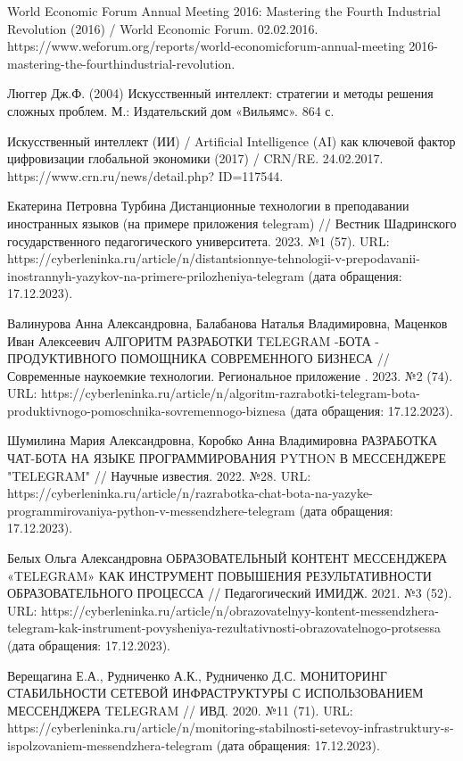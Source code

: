 \documentclass{article}
\begin{document}
World Economic Forum Annual Meeting 2016: Mastering the Fourth Industrial Revolution (2016) / World Economic Forum. 02.02.2016. https://www.weforum.org/reports/world-economicforum-annual-meeting 2016-mastering-the-fourthindustrial-revolution. 

Люггер Дж.Ф. (2004) Искусственный интеллект: стратегии и методы решения сложных проблем. М.: Издательский дом «Вильямс». 864 с.

Искусственный интеллект (ИИ) / Artificial Intelligence (AI) как ключевой фактор цифровизации глобальной экономики (2017) / CRN/RE. 24.02.2017. https://www.crn.ru/news/detail.php? ID=117544.

Екатерина Петровна Турбина Дистанционные технологии в преподавании иностранных языков (на примере приложения telegram) // Вестник Шадринского государственного педагогического университета. 2023. №1 (57). URL: https://cyberleninka.ru/article/n/distantsionnye-tehnologii-v-prepodavanii-inostrannyh-yazykov-na-primere-prilozheniya-telegram (дата обращения: 17.12.2023).

Валинурова Анна Александровна, Балабанова Наталья Владимировна, Маценков Иван Алексеевич АЛГОРИТМ РАЗРАБОТКИ TELEGRAM -БОТА - ПРОДУКТИВНОГО ПОМОЩНИКА СОВРЕМЕННОГО БИЗНЕСА // Современные наукоемкие технологии. Региональное приложение . 2023. №2 (74). URL: https://cyberleninka.ru/article/n/algoritm-razrabotki-telegram-bota-produktivnogo-pomoschnika-sovremennogo-biznesa (дата обращения: 17.12.2023).

Шумилина Мария Александровна, Коробко Анна Владимировна РАЗРАБОТКА ЧАТ-БОТА НА ЯЗЫКЕ ПРОГРАММИРОВАНИЯ PYTHON В МЕССЕНДЖЕРЕ "TELEGRAM" // Научные известия. 2022. №28. URL: https://cyberleninka.ru/article/n/razrabotka-chat-bota-na-yazyke-programmirovaniya-python-v-messendzhere-telegram (дата обращения: 17.12.2023).

Белых Ольга Александровна ОБРАЗОВАТЕЛЬНЫЙ КОНТЕНТ МЕССЕНДЖЕРА «TELEGRAM» КАК ИНСТРУМЕНТ ПОВЫШЕНИЯ РЕЗУЛЬТАТИВНОСТИ ОБРАЗОВАТЕЛЬНОГО ПРОЦЕССА // Педагогический ИМИДЖ. 2021. №3 (52). URL: https://cyberleninka.ru/article/n/obrazovatelnyy-kontent-messendzhera-telegram-kak-instrument-povysheniya-rezultativnosti-obrazovatelnogo-protsessa (дата обращения: 17.12.2023).

Верещагина Е.А., Рудниченко А.К., Рудниченко Д.С. МОНИТОРИНГ СТАБИЛЬНОСТИ СЕТЕВОЙ ИНФРАСТРУКТУРЫ С ИСПОЛЬЗОВАНИЕМ МЕССЕНДЖЕРА TELEGRAM // ИВД. 2020. №11 (71). URL: https://cyberleninka.ru/article/n/monitoring-stabilnosti-setevoy-infrastruktury-s-ispolzovaniem-messendzhera-telegram (дата обращения: 17.12.2023).
\end{document}
